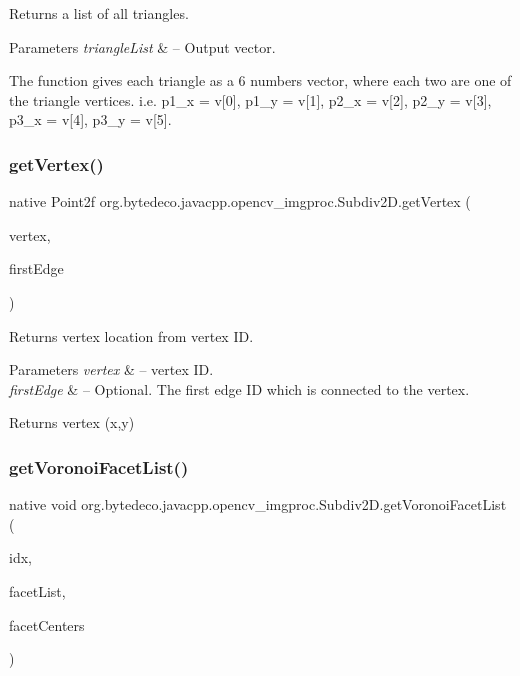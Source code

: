 Returns a list of all triangles. 


\begin{DoxyParams}{Parameters}
{\em triangle\+List} & – Output vector. \\
\hline
\end{DoxyParams}
The function gives each triangle as a 6 numbers vector, where each two are one of the triangle vertices. i.\+e. p1\+\_\+x = v\mbox{[}0\mbox{]}, p1\+\_\+y = v\mbox{[}1\mbox{]}, p2\+\_\+x = v\mbox{[}2\mbox{]}, p2\+\_\+y = v\mbox{[}3\mbox{]}, p3\+\_\+x = v\mbox{[}4\mbox{]}, p3\+\_\+y = v\mbox{[}5\mbox{]}. \mbox{\label{group__imgproc_gaf2a77c9870a51b9b26eb2eff3e77b97e}} 
\subsubsection{\texorpdfstring{get\+Vertex()}{getVertex()}}
{\footnotesize\ttfamily native Point2f org.\+bytedeco.\+javacpp.\+opencv\+\_\+imgproc.\+Subdiv2\+D.\+get\+Vertex (\begin{DoxyParamCaption}\item[{int}]{vertex,  }\item[{Int\+Pointer}]{first\+Edge }\end{DoxyParamCaption})}



Returns vertex location from vertex ID. 


\begin{DoxyParams}{Parameters}
{\em vertex} & – vertex ID. \\
\hline
{\em first\+Edge} & – Optional. The first edge ID which is connected to the vertex. \\
\hline
\end{DoxyParams}
\begin{DoxyReturn}{Returns}
vertex (x,y) 
\end{DoxyReturn}
\mbox{\label{group__imgproc_ga3f67d6d59372cbe845eda2627aa4889f}} 
\subsubsection{\texorpdfstring{get\+Voronoi\+Facet\+List()}{getVoronoiFacetList()}}
{\footnotesize\ttfamily native void org.\+bytedeco.\+javacpp.\+opencv\+\_\+imgproc.\+Subdiv2\+D.\+get\+Voronoi\+Facet\+List (\begin{DoxyParamCaption}\item[{@Std\+Vector Int\+Pointer}]{idx,  }\item[{@By\+Ref Point2f\+Vector\+Vector}]{facet\+List,  }\item[{@By\+Ref Point2f\+Vector}]{facet\+Centers }\end{DoxyParamCaption})}



